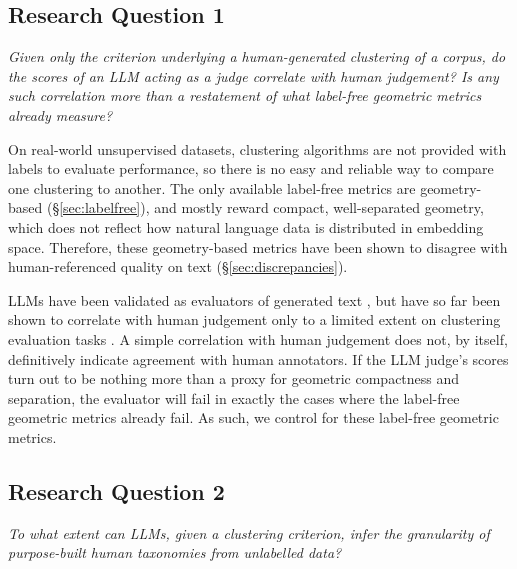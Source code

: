\documentclass[11pt,a4paper,oneside]{report}
\begin{document}
\subsection{Research Question 1}

\emph{Given only the criterion underlying a human-generated clustering of a corpus, do the scores of an LLM acting as a judge correlate with human judgement? Is any such correlation more than a restatement of what label-free geometric metrics already measure?}                                                                                                                                                                                         

\vspace{\baselineskip}

On real-world unsupervised datasets, clustering algorithms are not provided with labels to evaluate performance, so there is no easy and reliable way to compare one clustering to another. The only available label-free metrics are geometry-based (\S\ref{sec:labelfree}), and mostly reward compact, well-separated geometry, which does not reflect how natural language data is distributed in embedding space. Therefore, these geometry-based metrics have been shown to disagree with human-referenced quality on text (\S\ref{sec:discrepancies}).

LLMs have been validated as evaluators of generated text \citep{zheng2023judging}, but have so far been shown to correlate with human judgement only to a limited extent on clustering evaluation tasks \citep{hoyle2025proxann}. A simple correlation with human judgement does not, by itself, definitively indicate agreement with human annotators. If the LLM judge's scores turn out to be nothing more than a proxy for geometric compactness and separation, the evaluator will fail in exactly the cases where the label-free geometric metrics already fail. As such, we control for these label-free geometric metrics.

\subsection{Research Question 2}

\emph{To what extent can LLMs, given a clustering criterion, infer the granularity of purpose-built human taxonomies from unlabelled data?}

\vspace{\baselineskip}
\end{document}
